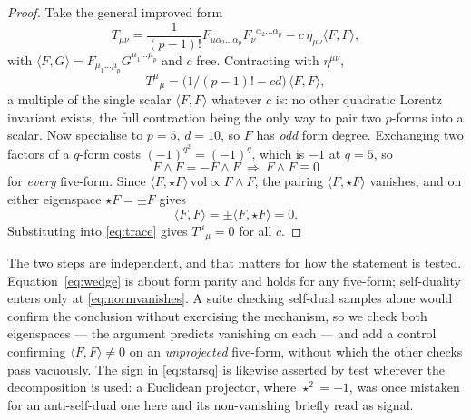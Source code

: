 \documentclass[
  aps,prd,
  reprint,
  letterpaper,
  amsmath,amssymb,
  nofootinbib,
  superscriptaddress
]{revtex4-2}
\theoremstyle{plain}
\begin{document}
\begin{proof}
Take the general improved form
\begin{equation}
T_{\mu\nu}=\frac{1}{(p-1)!}F_{\mu\alpha_2\dots\alpha_p}F_\nu{}^{\alpha_2\dots\alpha_p}
-c\,\eta_{\mu\nu}\langle F,F\rangle,
\label{eq:stress}
\end{equation}
with $\langle F,G\rangle=F_{\mu_1\dots\mu_p}G^{\mu_1\dots\mu_p}$ and $c$ free.
Contracting with $\eta^{\mu\nu}$,
\begin{equation}
T^\mu{}_\mu=\bigl(1/(p-1)!-cd\bigr)\,\langle F,F\rangle,
\label{eq:trace}
\end{equation}
a multiple of the single scalar $\langle F,F\rangle$ whatever $c$ is: no other
quadratic Lorentz invariant exists, the full contraction being the only way to
pair two $p$-forms into a scalar. Now specialise to $p=5$, $d=10$, so $F$ has
\emph{odd} form degree. Exchanging two factors of a $q$-form costs
$(-1)^{q^2}=(-1)^q$, which is $-1$ at $q=5$, so
\begin{equation}
F\wedge F=-F\wedge F\ \Longrightarrow\ F\wedge F\equiv 0
\label{eq:wedge}
\end{equation}
for \emph{every} five-form. Since
$\langle F,\star F\rangle\,\mathrm{vol}\propto F\wedge F$, the pairing
$\langle F,\star F\rangle$ vanishes, and on either eigenspace $\star F=\pm F$
gives
\begin{equation}
\langle F,F\rangle=\pm\langle F,\star F\rangle=0 .
\label{eq:normvanishes}
\end{equation}
Substituting into \eqref{eq:trace} gives $T^\mu{}_\mu=0$ for all $c$.
\end{proof}

The two steps are independent, and that matters for how the statement is tested.
Equation~\eqref{eq:wedge} is about form parity and holds for any five-form;
self-duality enters only at \eqref{eq:normvanishes}. A suite checking self-dual
samples alone would confirm the conclusion without exercising the mechanism, so
we check both eigenspaces --- the argument predicts vanishing on each --- and add
a control confirming $\langle F,F\rangle\neq0$ on an \emph{unprojected}
five-form, without which the other checks pass vacuously. The sign in
\eqref{eq:starsq} is likewise asserted by test wherever the decomposition is
used: a Euclidean projector, where $\star^2=-1$, was once mistaken for an
anti-self-dual one here and its non-vanishing briefly read as signal.
\end{document}

